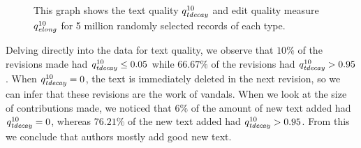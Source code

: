 \begin{figure}[tbhp]
    \begin{center}
    \end{center}
    \caption[Measuring edit and text quality over revisions]{
    	This graph shows the text quality $\quality{tdecay}{10}{}$
        and edit quality measure $\quality{elong}{10}{}$
	for 5 million randomly selected records of each type.
    }
    \label{fig-revs-quality}
\end{figure}

Delving directly into the data for text quality, we observe
that $10\%$ of the revisions made had 
$\quality{tdecay}{10}{} \le 0.05$ while $66.67\%$ of the revisions had
$\quality{tdecay}{10}{} > 0.95$.
When $\quality{tdecay}{10}{} = 0$, the text is immediately deleted
in the next revision, so we can infer that these revisions
are the work of vandals.
When we look at the size of contributions made, we noticed that
$6\%$ of the amount of new text added had $\quality{tdecay}{10}{} = 0$,
whereas $76.21\%$ of the new text added had $\quality{tdecay}{10}{} > 0.95$.
From this we conclude that authors mostly add good new text.

